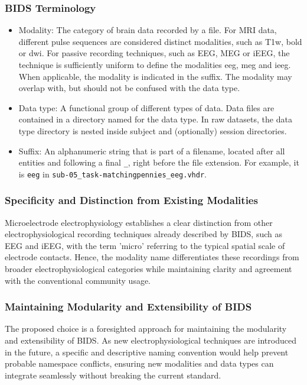 \documentclass[fleqn,10pt]{wlscirep}
\begin{document}
\subsubsection*{BIDS Terminology}
\begin{itemize}
    \item Modality: The category of brain data recorded by a file. For MRI data, different pulse sequences are considered distinct modalities, such as T1w, bold or dwi. For passive recording techniques, such as EEG, MEG or iEEG, the technique is sufficiently uniform to define the modalities eeg, meg and ieeg. When applicable, the modality is indicated in the suffix. The modality may overlap with, but should not be confused with the data type.
    \item Data type: A functional group of different types of data. Data files are contained in a directory named for the data type. In raw datasets, the data type directory is nested inside subject and (optionally) session directories.
    \item Suffix: An alphanumeric string that is part of a filename, located after all entities and following a final \texttt{\_}, right before the file extension. For example, it is \texttt{eeg} in \texttt{sub-05\_task-matchingpennies\_eeg.vhdr}.
\end{itemize}

\subsubsection*{Specificity and Distinction from Existing Modalities}
Microelectrode electrophysiology establishes a clear distinction from other electrophysiological recording techniques already described by BIDS, such as EEG and iEEG, with the term 'micro' referring to the typical spatial scale of electrode contacts. Hence, the modality name differentiates these recordings from broader electrophysiological categories while maintaining clarity and agreement with the conventional community usage.

\subsubsection*{Maintaining Modularity and Extensibility of BIDS}
The proposed choice is a foresighted approach for maintaining the modularity and extensibility of BIDS. As new electrophysiological techniques are introduced in the future, a specific and descriptive naming convention would help prevent probable namespace conflicts, ensuring new modalities and data types can integrate seamlessly without breaking the current standard.
\end{document}
